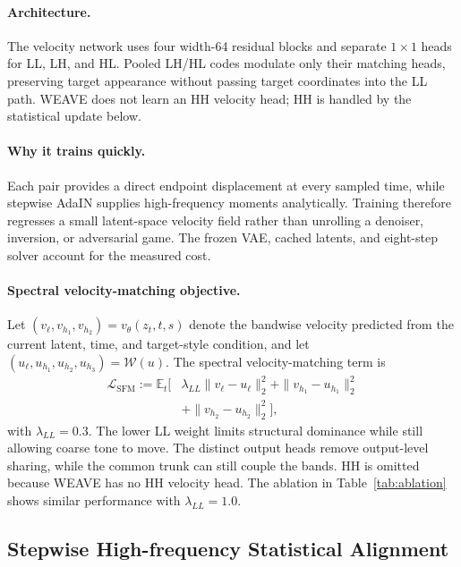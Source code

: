 \documentclass[letterpaper]{article}
\begin{document}
\paragraph{Architecture.}
The velocity network uses four width-64 residual blocks and separate $1{\times}1$ heads
for LL, LH, and HL. Pooled LH/HL codes modulate only their matching heads, preserving
target appearance without passing target coordinates into the LL path. WEAVE does not learn
an HH velocity head; HH is handled by the statistical update below.

\paragraph{Why it trains quickly.}
Each pair provides a direct endpoint displacement at every sampled time, while
stepwise AdaIN supplies high-frequency moments analytically. Training therefore regresses a
small latent-space velocity field rather than unrolling a denoiser, inversion, or adversarial
game. The frozen VAE, cached latents, and eight-step solver account for the measured cost.

\paragraph{Spectral velocity-matching objective.}
Let $(v_\ell,v_{h_1},v_{h_2})=v_\theta(z_t,t,s)$ denote the bandwise velocity predicted
from the current latent, time, and target-style condition, and let
$(u_\ell,u_{h_1},u_{h_2},u_{h_3})=\mathcal W(u)$. The spectral velocity-matching term is
\begin{equation}
\begin{aligned}
\mathcal L_{\mathrm{SFM}}:=\mathbb E_t\big[&
\lambda_{LL}\|v_\ell-u_\ell\|_2^2
+\|v_{h_1}-u_{h_1}\|_2^2\\
&+\|v_{h_2}-u_{h_2}\|_2^2\big],
\end{aligned}
\label{eq:weave-loss}
\end{equation}
with $\lambda_{LL}=0.3$. The lower LL weight limits structural
dominance while still allowing coarse tone to move.
The distinct output heads remove output-level sharing, while the common trunk can still
couple the bands. HH is omitted because WEAVE has no HH velocity head. The ablation in
Table~\ref{tab:ablation} shows similar performance with $\lambda_{LL}=1.0$.

\subsection{Stepwise High-frequency Statistical Alignment}
\label{sec:eota}
\end{document}
